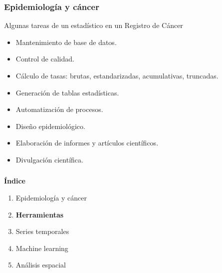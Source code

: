 \documentclass{beamer}
\begin{document}

\begin{frame}\frametitle{Epidemiología y cáncer}
	\begin{block}{Algunas tareas de un estadístico en un Registro de Cáncer}
		\begin{itemize}
			\item Mantenimiento de base de datos.
			\item Control de calidad.
			\item Cálculo de tasas: brutas, estandarizadas, acumulativas, truncadas.
			\item Generación de tablas estadísticas.
			\item Automatización de procesos.
			\item Diseño epidemiológico.
			\item Elaboración de informes y artículos científicos.
			\item Divulgación científica.
		\end{itemize}
	\end{block}	
\end{frame}


\begin{frame}\frametitle{}
	\Large{\textbf{Índice}}\\[2ex]
	\normalsize
	\begin{enumerate}
		\item Epidemiología y cáncer\\[2ex]
		\item \textbf{Herramientas}\\[2ex]
		\item Series temporales \\[2ex]
		\item Machine learning  \\[2ex]
		\item Análisis espacial \\[2ex]
	\end{enumerate}	
\end{frame}

\end{document}
